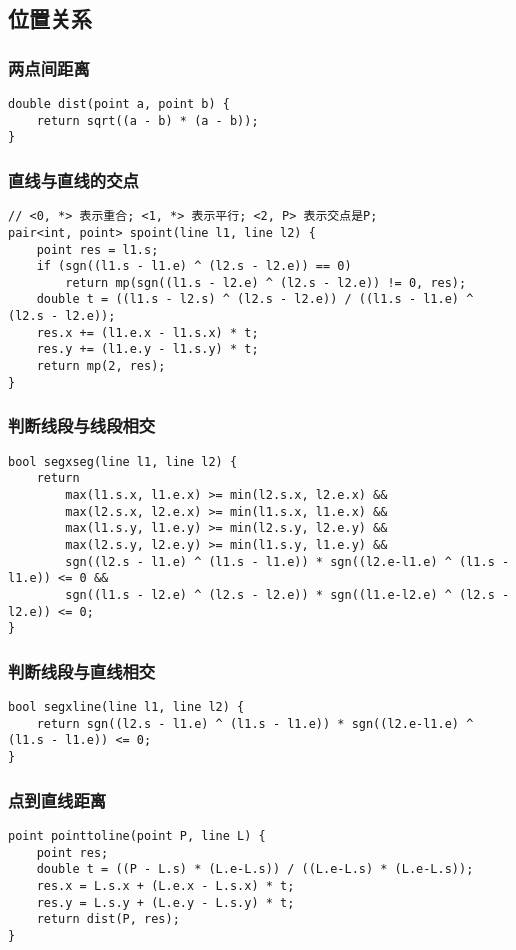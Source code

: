 \documentclass[a4paper]{article}
\begin{document}
\subsection{位置关系}
\subsubsection{两点间距离}
\begin{lstlisting}
double dist(point a, point b) {
    return sqrt((a - b) * (a - b));
}
\end{lstlisting}
\subsubsection{直线与直线的交点}
\begin{lstlisting}
// <0, *> 表示重合; <1, *> 表示平行; <2, P> 表示交点是P;
pair<int, point> spoint(line l1, line l2) {
    point res = l1.s;
    if (sgn((l1.s - l1.e) ^ (l2.s - l2.e)) == 0)
        return mp(sgn((l1.s - l2.e) ^ (l2.s - l2.e)) != 0, res);
    double t = ((l1.s - l2.s) ^ (l2.s - l2.e)) / ((l1.s - l1.e) ^ (l2.s - l2.e));
    res.x += (l1.e.x - l1.s.x) * t;
    res.y += (l1.e.y - l1.s.y) * t;
    return mp(2, res);
}\end{lstlisting}
\subsubsection{判断线段与线段相交}
\begin{lstlisting}
bool segxseg(line l1, line l2) {
    return
        max(l1.s.x, l1.e.x) >= min(l2.s.x, l2.e.x) &&
        max(l2.s.x, l2.e.x) >= min(l1.s.x, l1.e.x) &&
        max(l1.s.y, l1.e.y) >= min(l2.s.y, l2.e.y) &&
        max(l2.s.y, l2.e.y) >= min(l1.s.y, l1.e.y) &&
        sgn((l2.s - l1.e) ^ (l1.s - l1.e)) * sgn((l2.e-l1.e) ^ (l1.s - l1.e)) <= 0 &&
        sgn((l1.s - l2.e) ^ (l2.s - l2.e)) * sgn((l1.e-l2.e) ^ (l2.s - l2.e)) <= 0;
}
\end{lstlisting}
\subsubsection{判断线段与直线相交}
\begin{lstlisting}
bool segxline(line l1, line l2) {
	return sgn((l2.s - l1.e) ^ (l1.s - l1.e)) * sgn((l2.e-l1.e) ^ (l1.s - l1.e)) <= 0;
}
\end{lstlisting}
\subsubsection{点到直线距离}
\begin{lstlisting}
point pointtoline(point P, line L) {
	point res;
	double t = ((P - L.s) * (L.e-L.s)) / ((L.e-L.s) * (L.e-L.s)); 
	res.x = L.s.x + (L.e.x - L.s.x) * t;
	res.y = L.s.y + (L.e.y - L.s.y) * t;
	return dist(P, res);
}
\end{lstlisting}
\end{document}
